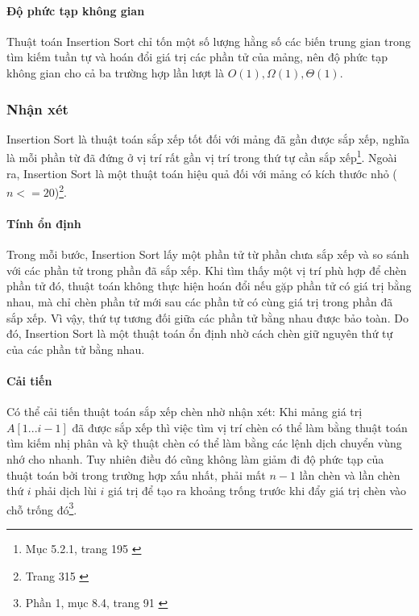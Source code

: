 \paragraph{Độ phức tạp không gian}
Thuật toán Insertion Sort chỉ tốn một số lượng hằng số các biến trung gian trong tìm kiếm tuần tự và hoán đổi giá trị các phần tử của mảng, nên độ phức tạp không gian cho cả ba trường hợp lần lượt là $O(1), \Omega(1), \Theta(1)$.


\subsubsection{Nhận xét}

Insertion Sort là thuật toán sắp xếp tốt đối với mảng đã gần được sắp xếp, nghĩa là mỗi phần từ đã đứng ở vị trí rất gần vị trí trong thứ tự cần sắp xếp\footnote{Mục 5.2.1, trang 195 \cite{dsa_nghia_2013}}. Ngoài ra, Insertion Sort là một thuật toán hiệu quả đối với mảng có kích thước nhỏ ($n <=20$)\footnote{Trang 315 \cite{dsa-analysis-cpp}}.

\paragraph{Tính ổn định}
Trong mỗi bước, Insertion Sort lấy một phần tử từ phần chưa sắp xếp và so sánh với các phần tử trong phần đã sắp xếp. Khi tìm thấy một vị trí phù hợp để chèn phần tử đó, thuật toán không thực hiện hoán đổi nếu gặp phần tử có giá trị bằng nhau, mà chỉ chèn phần tử mới sau các phần tử có cùng giá trị trong phần đã sắp xếp. Vì vậy, thứ tự tương đối giữa các phần tử bằng nhau được bảo toàn.
Do đó, Insertion Sort là một thuật toán ổn định nhờ cách chèn giữ nguyên thứ tự của các phần tử bằng nhau. 

\paragraph{Cải tiến}
 Có thể cải tiến thuật toán sắp xếp chèn nhờ nhận xét: Khi mảng giá trị $A[1...i-1]$ đã được sắp xếp thì việc tìm vị trí chèn có thể làm bằng thuật toán tìm kiếm nhị phân và kỹ thuật chèn có thể làm bằng các lệnh dịch chuyển vùng nhớ cho nhanh. Tuy nhiên điều đó cũng không làm giảm đi độ phức tạp của thuật toán bởi trong trường hợp xấu nhất, phải mất $n - 1$ lần chèn và lần chèn thứ $i$ phải dịch lùi $i$ giá trị để tạo ra khoảng trống trước khi đẩy giá trị chèn vào chỗ trống đó\footnote{Phần 1, mục 8.4, trang 91 \cite{hoang1999giaithuat}}.

